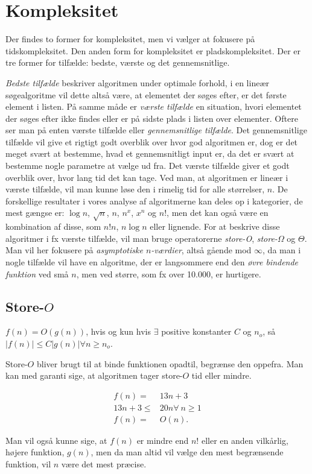 \section{Kompleksitet} \label{kap:kompleksitet}

Der findes to former for kompleksitet, men vi vælger at fokusere på tidskompleksitet. Den anden form for kompleksitet er pladskompleksitet. 
Der er tre former for tilfælde: bedste, værste og det gennemsnitlige. 

\emph{Bedste tilfælde} beskriver algoritmen under optimale forhold, i en lineær søgealgoritme vil dette altså være, at elementet der søges efter, er det første element i listen. På samme måde er \emph{værste tilfælde} en situation, hvori elementet der søges efter ikke findes eller er på sidste plads i listen over elementer.
Oftere ser man på enten værste tilfælde eller \emph{gennemsnitlige tilfælde}. 
Det gennemsnitlige tilfælde vil give et rigtigt godt overblik over hvor god algoritmen er, dog er det meget svært at bestemme, hvad et gennemsnitligt input er, da det er svært at bestemme nogle parametre at vælge ud fra. 
Det værste tilfælde giver et godt overblik over, hvor lang tid det kan tage. Ved man, at algoritmen er lineær i værste tilfælde, vil man kunne løse den i rimelig tid for alle størrelser, $n$.
De forskellige resultater i vores analyse af algoritmerne kan deles op i kategorier, de mest gængse er: $\log n$, $\sqrt{n}$, $n$, $n^x$, $x^n$ og $n!$, men det kan også være en kombination af disse, som $n!n$, $n\log n$ eller lignende.
For at beskrive disse algoritmer i fx værste tilfælde, vil man bruge operatorerne \emph{store-O}, \emph{store-$\Omega$} og \emph{$\Theta$}. Man vil her fokusere på \emph{asymptotiske $n$-værdier}, altså gående mod $\infty$, da man i nogle tilfælde vil have en algoritme, der er langsommere end den \emph{øvre bindende funktion} ved små $n$, men ved større, som fx over 10.000, er hurtigere.

\subsection{Store-$O$}
\begin{defn}
$f(n)= O(g(n))$, hvis og kun hvis $\exists$ positive konstanter $C$ og $n_o$, så $|f(n)| \leq C |g(n)| \forall n \geq n_o$.
\end{defn}

Store-$O$ bliver brugt til at binde funktionen opadtil, begrænse den oppefra. Man kan med garanti sige, at algoritmen tager store-$O$ tid eller mindre. 
\begin{exmp}
\begin{align}
f(n)=& 13n+3 \\
13n+3 \leq& 20n \forall \ n \geq 1 \\
f(n) =& O(n).
\end{align}
\end{exmp}
Man vil også kunne sige, at $f(n)$ er mindre end $n!$ eller en anden vilkårlig, højere funktion, $g(n)$, men da man altid vil vælge den mest begrænsende funktion, vil $n$ være det mest præcise. 

